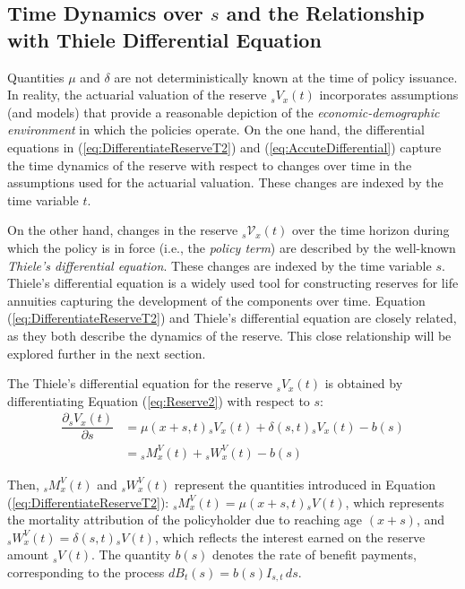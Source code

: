 \documentclass[12pt]{article}
\begin{document}
{\subsection{Time Dynamics over $s$ and the Relationship with Thiele Differential Equation}\label{sec:ThieleEquations}


Quantities \( \mu \) and \( \delta \) are not deterministically known at the time of policy issuance. In reality, the actuarial valuation of the reserve \( {}_sV_x(t) \) incorporates assumptions (and models) that provide a reasonable depiction of the \textit{economic-demographic environment} in which the policies operate. On the one hand, the differential equations in (\ref{eq:DifferentiateReserveT2}) and (\ref{eq:AccuteDifferential}) capture the time dynamics of the reserve with respect to changes over time in the assumptions used for the actuarial valuation. These changes are indexed by the time variable \( t \).

On the other hand, changes in the reserve \( {}_s\mathcal{V}_x(t) \) over the time horizon during which the policy is in force (i.e., the \textit{policy term}) are described by the well-known \textit{Thiele's differential equation}. These changes are indexed by the time variable \( s \). Thiele's differential equation is a widely used tool for constructing reserves for life annuities capturing the development of the components over time. Equation (\ref{eq:DifferentiateReserveT2}) and Thiele's differential equation are closely related, as they both describe the dynamics of the reserve. This close relationship will be explored further in the next section.

The Thiele's differential equation for the reserve \( {}_sV_x(t) \) is obtained by differentiating Equation (\ref{eq:Reserve2}) with respect to \( s \):
\begin{equation}\label{eq:Thiele}
	\begin{split}
		\dfrac{\partial {}_sV_x(t)}{\partial s}&= \mu(x+s,t){}_sV_x(t) + \delta(s,t){}_sV_x(t) - b(s) \\
		&= {}_sM^V_x(t) + {}_sW^V_x(t) - b(s)
	\end{split}
\end{equation}

Then, ${}_sM^V_x(t)$ and ${}_sW^V_x(t)$ represent the quantities introduced in Equation (\ref{eq:DifferentiateReserveT2}): ${}_sM^V_x(t) = \mu(x+s,t){}_sV(t)$, which represents the mortality attribution of the policyholder due to reaching age \( (x+s) \), and ${}_sW^V_x(t) = \delta(s,t){}_sV(t)$, which reflects the interest earned on the reserve amount ${}_sV(t)$. The quantity \( b(s) \) denotes the rate of benefit payments, corresponding to the process \( dB_t(s) = b(s) I_{s,t} \, ds \).

}
\end{document}
